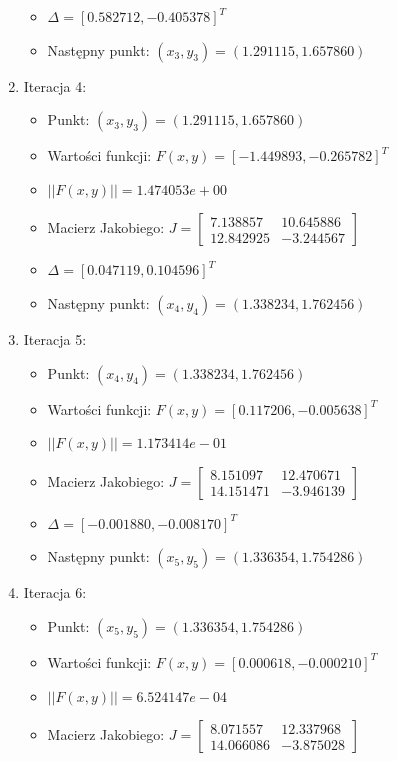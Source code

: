 \documentclass[a4paper,12pt]{article}
\begin{document}
\begin{enumerate}
\begin{itemize}
        \item $\Delta = [0.582712, -0.405378]^T$
        \item Następny punkt: $(x_3, y_3) = (1.291115, 1.657860)$
      \end{itemize}
    \item Iteracja 4:
      \begin{itemize}
        \item Punkt: $(x_3, y_3) = (1.291115, 1.657860)$
        \item Wartości funkcji: $F(x,y) = [-1.449893, -0.265782]^T$
        \item $||F(x,y)|| = 1.474053e+00$
        \item Macierz Jakobiego: $J = \begin{bmatrix} 7.138857 & 10.645886 \\ 12.842925 & -3.244567 \end{bmatrix}$
        \item $\Delta = [0.047119, 0.104596]^T$
        \item Następny punkt: $(x_4, y_4) = (1.338234, 1.762456)$
      \end{itemize}
    \item Iteracja 5:
      \begin{itemize}
        \item Punkt: $(x_4, y_4) = (1.338234, 1.762456)$
        \item Wartości funkcji: $F(x,y) = [0.117206, -0.005638]^T$
        \item $||F(x,y)|| = 1.173414e-01$
        \item Macierz Jakobiego: $J = \begin{bmatrix} 8.151097 & 12.470671 \\ 14.151471 & -3.946139 \end{bmatrix}$
        \item $\Delta = [-0.001880, -0.008170]^T$
        \item Następny punkt: $(x_5, y_5) = (1.336354, 1.754286)$
      \end{itemize}
    \item Iteracja 6:
      \begin{itemize}
        \item Punkt: $(x_5, y_5) = (1.336354, 1.754286)$
        \item Wartości funkcji: $F(x,y) = [0.000618, -0.000210]^T$
        \item $||F(x,y)|| = 6.524147e-04$
        \item Macierz Jakobiego: $J = \begin{bmatrix} 8.071557 & 12.337968 \\ 14.066086 & -3.875028 \end{bmatrix}$

\end{itemize}
\end{enumerate}
\end{document}
